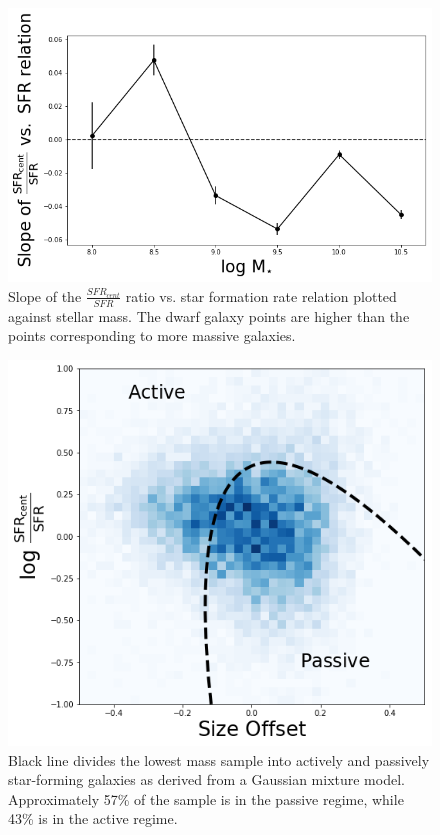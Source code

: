 \documentclass[iop]{emulateapj}
\begin{document}
\begin{figure}
	\centering
	\includegraphics[width= \columnwidth]{cent_sfr_slopes.png}
	\caption{Slope of the $\frac{SFR_{cent}}{SFR}$ ratio vs. star formation rate relation plotted against stellar mass.  The dwarf galaxy points are higher than the points corresponding to more massive galaxies.}
	\label{fig:dens_slope}
	
\end{figure}



\begin{figure}
	\centering
	\includegraphics[width=1. \columnwidth]{GMM.png}
	\caption{Black line divides the lowest mass sample into actively and passively star-forming galaxies as derived from a Gaussian mixture model. Approximately 57\% of the sample is in the passive regime, while 43\% is in the active regime.}
	\label{fig:HA_duty}
	
\end{figure}
\end{document}
